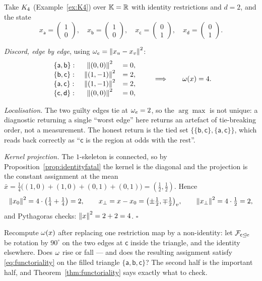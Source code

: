 \begin{workedbox}\Worked
Take $K_4$ (Example~\ref{ex:K4}) over $\mathbb{K}=\mathbb{R}$ with identity
restrictions and $d=2$, and the state
\[
  x_{\mathsf a}=\begin{pmatrix}1\\0\end{pmatrix},\quad
  x_{\mathsf b}=\begin{pmatrix}1\\0\end{pmatrix},\quad
  x_{\mathsf c}=\begin{pmatrix}0\\1\end{pmatrix},\quad
  x_{\mathsf d}=\begin{pmatrix}0\\1\end{pmatrix}.
\]

\emph{Discord, edge by edge}, using $\omega_e=\left\lVert x_u-x_v \right\rVert^2$:
\[
\begin{array}{lcl}
  \{\mathsf a,\mathsf b\}:&\ \left\lVert (0,0) \right\rVert^2 &= 0,\\
  \{\mathsf b,\mathsf c\}:&\ \left\lVert (1,-1) \right\rVert^2 &= 2,\\
  \{\mathsf a,\mathsf c\}:&\ \left\lVert (1,-1) \right\rVert^2 &= 2,\\
  \{\mathsf c,\mathsf d\}:&\ \left\lVert (0,0) \right\rVert^2 &= 0,
\end{array}
\qquad\Longrightarrow\qquad \omega(x)=4 .
\]

\emph{Localisation.} The two guilty edges tie at $\omega_e=2$, so the
$\arg\max$ is not unique: a diagnostic returning a single ``worst edge'' here
returns an artefact of tie-breaking order, not a measurement. The honest
return is the tied set
$\{\{\mathsf b,\mathsf c\},\{\mathsf a,\mathsf c\}\}$, which reads back
correctly as ``$\mathsf c$ is the region at odds with the rest''.

\emph{Kernel projection.} The $1$-skeleton is connected, so by
Proposition~\ref{prop:identityfatal} the kernel is the diagonal and the
projection is the constant assignment at the mean
$\bar x=\tfrac14\bigl((1,0)+(1,0)+(0,1)+(0,1)\bigr)=(\tfrac12,\tfrac12)$.
Hence
\[
  \left\lVert x_0 \right\rVert^2=4\cdot\bigl(\tfrac14+\tfrac14\bigr)=2,\qquad
  x_\perp=x-x_0=\bigl(\pm\tfrac12,\mp\tfrac12\bigr)_v,\qquad
  \left\lVert x_\perp \right\rVert^2=4\cdot\tfrac12=2,
\]
and Pythagoras checks: $\left\lVert x \right\rVert^2=2+2=4$. \hfill$\square$
\end{workedbox}

\begin{exercise}
Recompute $\omega(x)$ after replacing one restriction map by a
non-identity: let $\mathcal{F}_{\mathsf c\trianglelefteq e}$ be rotation by $90^\circ$ on the
two edges at $\mathsf c$ inside the triangle, and the identity elsewhere. Does
$\omega$ rise or fall --- and does the resulting assignment satisfy
\eqref{eq:functoriality} on the filled triangle
$\{\mathsf a,\mathsf b,\mathsf c\}$? The second half is the important half,
and Theorem~\ref{thm:functoriality} says exactly what to check.
\end{exercise}

